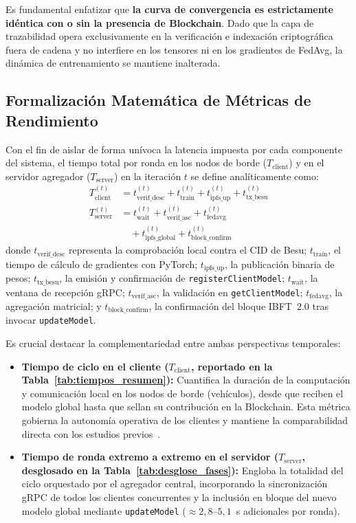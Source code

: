 Es fundamental enfatizar que \textbf{la curva de convergencia es estrictamente idéntica con o sin la presencia de Blockchain}. Dado que la capa de trazabilidad opera exclusivamente en la verificación e indexación criptográfica fuera de cadena y no interfiere en los tensores ni en los gradientes de FedAvg, la dinámica de entrenamiento se mantiene inalterada.

\subsection{Formalización Matemática de Métricas de Rendimiento}
Con el fin de aislar de forma unívoca la latencia impuesta por cada componente del sistema, el tiempo total por ronda en los nodos de borde ($T_{\text{client}}$) y en el servidor agregador ($T_{\text{server}}$) en la iteración $t$ se define analíticamente como:
\begin{align}
T_{\text{client}}^{(t)} &= t_{\text{verif\_desc}}^{(t)} + t_{\text{train}}^{(t)} + t_{\text{ipfs\_up}}^{(t)} + t_{\text{tx\_besu}}^{(t)} \label{eq:t_client} \\
T_{\text{server}}^{(t)} &= t_{\text{wait}}^{(t)} + t_{\text{verif\_asc}}^{(t)} + t_{\text{fedavg}}^{(t)} \nonumber \\
&\quad + t_{\text{ipfs\_global}}^{(t)} + t_{\text{block\_confirm}}^{(t)} \label{eq:t_server}
\end{align}
donde $t_{\text{verif\_desc}}$ representa la comprobación local contra el CID de Besu; $t_{\text{train}}$, el tiempo de cálculo de gradientes con PyTorch; $t_{\text{ipfs\_up}}$, la publicación binaria de pesos; $t_{\text{tx\_besu}}$, la emisión y confirmación de \texttt{registerClientModel}; $t_{\text{wait}}$, la ventana de recepción gRPC; $t_{\text{verif\_asc}}$, la validación en \texttt{getClientModel}; $t_{\text{fedavg}}$, la agregación matricial; y $t_{\text{block\_confirm}}$, la confirmación del bloque IBFT~2.0 tras invocar \texttt{updateModel}.

Es crucial destacar la complementariedad entre ambas perspectivas temporales:
\begin{itemize}
    \item \textbf{Tiempo de ciclo en el cliente ($T_{\text{client}}$, reportado en la Tabla~\ref{tab:tiempos_resumen}):} Cuantifica la duración de la computación y comunicación local en los nodos de borde (vehículos), desde que reciben el modelo global hasta que sellan su contribución en la Blockchain. Esta métrica gobierna la autonomía operativa de los clientes y mantiene la comparabilidad directa con los estudios previos~\cite{cloudlabaia_flblockchain}.
    \item \textbf{Tiempo de ronda extremo a extremo en el servidor ($T_{\text{server}}$, desglosado en la Tabla~\ref{tab:desglose_fases}):} Engloba la totalidad del ciclo orquestado por el agregador central, incorporando la sincronización gRPC de todos los clientes concurrentes y la inclusión en bloque del nuevo modelo global mediante \texttt{updateModel} ($\approx 2{,}8\text{--}5{,}1$~s adicionales por ronda).
\end{itemize}


